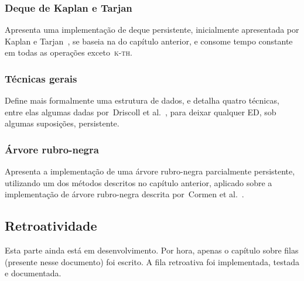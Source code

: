 \documentclass[quali.tex]{subfile}
\begin{document}
\subsubsection*{Deque de Kaplan e Tarjan}
	Apresenta uma implementação de deque persistente, inicialmente apresentada por Kaplan e Tarjan~\cite{KaplanT1999}, se baseia na do capítulo anterior, e consome tempo constante em todas as operações exceto~\textsc{k-th}.
\subsubsection*{Técnicas gerais}
	Define mais formalmente uma estrutura de dados, e detalha quatro técnicas, entre elas algumas dadas por~Driscoll et al.~\cite{DriscollSST1989}, para deixar qualquer ED, sob algumas suposições, persistente.
\subsubsection*{Árvore rubro-negra}
	Apresenta a implementação de uma árvore rubro-negra parcialmente persistente, utilizando um dos métodos descritos no capítulo anterior, aplicado sobre a implementação de árvore rubro-negra descrita por~Cormen et al.~\cite{CormenRedBlack}.

\subsection{Retroatividade}

Esta parte ainda está em desenvolvimento. Por hora, apenas o capítulo sobre filas (presente nesse documento) foi escrito. A fila retroativa foi implementada, testada e documentada.
\end{document}
